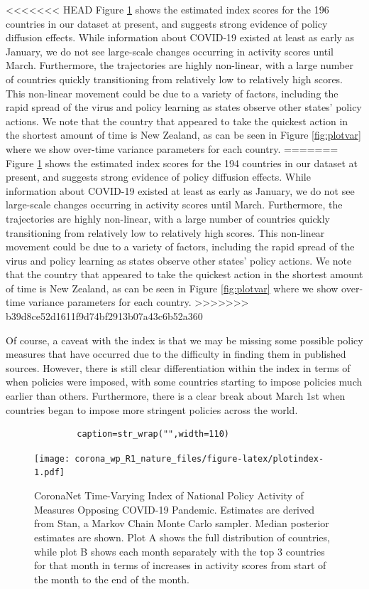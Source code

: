 \documentclass[]{article}
\begin{document}
<<<<<<< HEAD
Figure \ref{fig:plotindex} shows the estimated index scores for the 196 countries in our dataset at present, and suggests strong evidence of policy diffusion effects. While information about COVID-19 existed at least as early as January, we do not see large-scale changes occurring in activity scores until March. Furthermore, the trajectories are highly non-linear, with a large number of countries quickly transitioning from relatively low to relatively high scores. This non-linear movement could be due to a variety of factors, including the rapid spread of the virus and policy learning as states observe other states' policy actions. We note that the country that appeared to take the quickest action in the shortest amount of time is New Zealand, as can be seen in Figure \ref{fig:plotvar} where we show over-time variance parameters for each country.
=======
Figure \ref{fig:plotindex} shows the estimated index scores for the 194 countries in our dataset at present, and suggests strong evidence of policy diffusion effects. While information about COVID-19 existed at least as early as January, we do not see large-scale changes occurring in activity scores until March. Furthermore, the trajectories are highly non-linear, with a large number of countries quickly transitioning from relatively low to relatively high scores. This non-linear movement could be due to a variety of factors, including the rapid spread of the virus and policy learning as states observe other states' policy actions. We note that the country that appeared to take the quickest action in the shortest amount of time is New Zealand, as can be seen in Figure \ref{fig:plotvar} where we show over-time variance parameters for each country.
>>>>>>> b39d8ce52d1611f9d74bf2913b07a43c6b52a360

Of course, a caveat with the index is that we may be missing some possible policy measures that have occurred due to the difficulty in finding them in published sources. However, there is still clear differentiation within the index in terms of when policies were imposed, with some countries starting to impose policies much earlier than others. Furthermore, there is a clear break about March 1st when countries began to impose more stringent policies across the world.

\begin{verbatim}
              caption=str_wrap("",width=110)
\end{verbatim}

\begin{figure}
\centering
\texttt{[image: corona\_wp\_R1\_nature\_files/figure-latex/plotindex-1.pdf]}
\caption{\label{fig:plotindex}CoronaNet Time-Varying Index of National Policy Activity of Measures Opposing COVID-19 Pandemic. Estimates are derived from Stan, a Markov Chain Monte Carlo sampler. Median posterior estimates are shown. Plot A shows the full distribution of countries, while plot B shows each month separately with the top 3 countries for that month in terms of increases in activity scores from start of the month to the end of the month.}
\end{figure}
\end{document}
